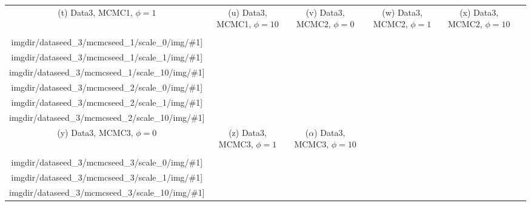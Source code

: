 {\begin{tabular}{cccccc}
    {\tiny (t) Data3, MCMC1, $\phi=1$} &
    {\tiny (u) Data3, MCMC1, $\phi=10$} &
    {\tiny (v) Data3, MCMC2, $\phi=0$} &
    {\tiny (w) Data3, MCMC2, $\phi=1$} &
    {\tiny (x) Data3, MCMC2, $\phi=10$} \\
    \texttt{[image: \\imgdir/dataseed\_3/mcmcseed\_1/scale\_0/img/\#1]} &
    \texttt{[image: \\imgdir/dataseed\_3/mcmcseed\_1/scale\_1/img/\#1]} &
    \texttt{[image: \\imgdir/dataseed\_3/mcmcseed\_1/scale\_10/img/\#1]} &
    \texttt{[image: \\imgdir/dataseed\_3/mcmcseed\_2/scale\_0/img/\#1]} &
    \texttt{[image: \\imgdir/dataseed\_3/mcmcseed\_2/scale\_1/img/\#1]} &
    \texttt{[image: \\imgdir/dataseed\_3/mcmcseed\_2/scale\_10/img/\#1]} \\
    {\tiny (y) Data3, MCMC3, $\phi=0$} &
    {\tiny (z) Data3, MCMC3, $\phi=1$} &
    {\tiny ($\alpha$) Data3, MCMC3, $\phi=10$} &
    & & \\
    \texttt{[image: \\imgdir/dataseed\_3/mcmcseed\_3/scale\_0/img/\#1]} &
    \texttt{[image: \\imgdir/dataseed\_3/mcmcseed\_3/scale\_1/img/\#1]} &
    \texttt{[image: \\imgdir/dataseed\_3/mcmcseed\_3/scale\_10/img/\#1]} &
    & & \\
  \end{tabular}
}
